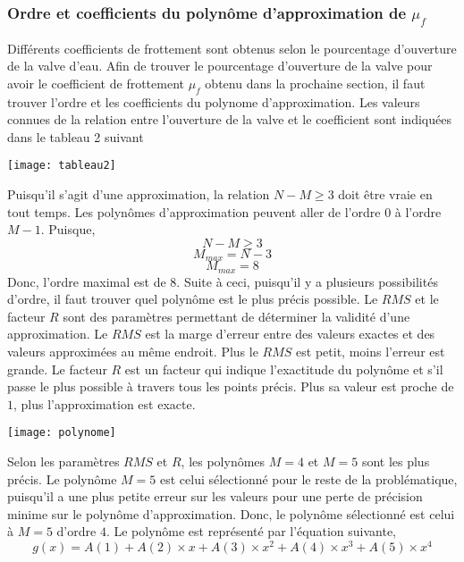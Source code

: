 \documentclass[12pt]{article}
\begin{document}
\subsubsection{Ordre et coefficients du polynôme d'approximation de $\mu_{f}$}
Différents coefficients de frottement sont obtenus selon le pourcentage d'ouverture de la valve d'eau. Afin de trouver le pourcentage d'ouverture de la valve pour avoir le coefficient de frottement $\mu_f$ obtenu dans la prochaine section, il faut trouver l'ordre et les coefficients du polynome d'approximation.
\newline
\newline
Les valeurs connues de la relation entre l'ouverture de la valve et le coefficient sont indiquées dans le tableau 2 suivant
\begin{center}
	\texttt{[image: tableau2]}
\end{center}
Puisqu'il s'agit d'une approximation, la relation $N - M \geq 3$ doit être vraie en tout temps. Les polynômes d'approximation peuvent aller de l'ordre $0$ à l'ordre $M - 1$. Puisque,
\begin{equation}
N - M \geq 3
\end{equation}
\begin{equation}
M_{max} = N - 3
\end{equation}
\begin{equation}
M_{max} = 8
\end{equation}
Donc, l'ordre maximal est de 8.
\newline
\newline
Suite à ceci, puisqu'il y a plusieurs possibilités d'ordre, il faut trouver quel polynôme est le plus précis possible. Le $RMS$ et le facteur $R$ sont des paramètres permettant de déterminer la validité d'une approximation. Le $RMS$ est la marge d'erreur entre des valeurs exactes et des valeurs approximées au même endroit. Plus le $RMS$ est petit, moins l'erreur est grande. Le facteur $R$ est un facteur qui indique l'exactitude du polynôme et s'il passe le plus possible à travers tous les points précis. Plus sa valeur est proche de $1$, plus l'approximation est exacte.
\newline
\begin{center}
	\texttt{[image: polynome]}
\end{center}
Selon les paramètres $RMS$ et $R$, les polynômes $M = 4$ et $M = 5$ sont les plus précis. Le polynôme $M = 5$ est celui sélectionné pour le reste de la problématique, puisqu'il a une plus petite erreur sur les valeurs pour une perte de précision minime sur le polynôme d'approximation.
\newline
\newline
Donc, le polynôme sélectionné est celui à $M = 5$ d'ordre $4$. Le polynôme est représenté par l'équation suivante,
\begin{equation}
g(x) = A(1) + A(2)\times x + A(3)\times x^2 + A(4)\times x^3 + A(5)\times x^4 
\end{equation}
\end{document}
